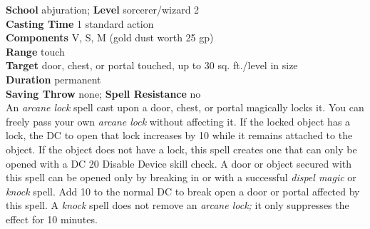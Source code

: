 \textbf{School }abjuration; \textbf{Level }sorcerer/wizard 2\\
\textbf{Casting Time }1 standard action\\
\textbf{Components }V, S, M (gold dust worth 25 gp)\\
\textbf{Range }touch\\
\textbf{Target }door, chest, or portal touched, up to 30 sq. ft./level in size\\
\textbf{Duration }permanent\\
\textbf{Saving Throw} none; \textbf{Spell Resistance} no\\
An \textit{arcane lock }spell cast upon a door, chest, or portal magically locks it. You can freely pass your own \textit{arcane lock }without affecting it. If the locked object has a lock, the DC to open that lock increases by 10 while it remains attached to the object. If the object does not have a lock, this spell creates one that can only be opened with a DC 20 Disable Device skill check. A door or object secured with this spell can be opened only by breaking in or with a successful \textit{dispel magic }or \textit{knock }spell. Add 10 to the normal DC to break open a door or portal affected by this spell. A \textit{knock }spell does not remove an \textit{arcane lock; }it only suppresses the effect for 10 minutes.\\
